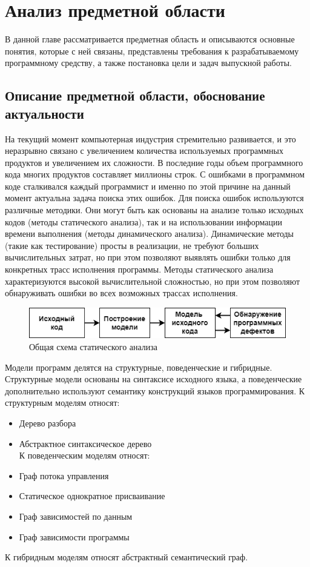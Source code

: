 \chapter{Анализ предметной области} \label{ch1}
В данной главе рассматривается предметная область и описываются основные понятия, которые с ней связаны, представлены требования к разрабатываемому программному средству, а также постановка цели и задач выпускной работы.
\section{Описание предметной области, обоснование актуальности} \label{ch1:sec1}
На текущий момент компьютерная индустрия стремительно развивается, и это неразрывно связано с увеличением количества используемых программных продуктов и увеличением их сложности. В последние годы объем программного кода многих продуктов составляет миллионы строк.
С ошибками в программном коде сталкивался каждый программист и именно по этой причине на данный момент актуальна задача поиска этих ошибок.
Для поиска ошибок используются различные методики. Они могут быть как основаны на анализе только исходных кодов (методы статического анализа), так и на использовании информации времени выполнения (методы динамического анализа).
Динамические методы (такие как тестирование) просты в реализации, не требуют больших вычислительных затрат, но при этом позволяют выявлять ошибки только для конкретных трасс исполнения программы. 
Методы статического анализа характеризуются высокой вычислительной сложностью, но при этом позволяют обнаруживать ошибки во всех возможных трассах исполнения.\\

\begin{figure} 
	\center
	\includegraphics [scale=1] {my_folder/images/my/1}
	\caption{Общая схема статического анализа} 
	\label{fig:1}  
\end{figure}

Модели программ делятся на структурные, поведенческие и гибридные. Структурные модели основаны на синтаксисе исходного языка, а поведенческие дополнительно используют семантику конструкций языков программирования.
К структурным моделям относят:
\begin{itemize}
\item Дерево разбора 
\item Абстрактное синтаксическое дерево\\
К поведенческим моделям относят:
\item Граф потока управления 
\item Статическое однократное присваивание
\item Граф зависимостей по данным
\item Граф зависимости программы
\end{itemize}
К гибридным моделям относят абстрактный семантический граф.
